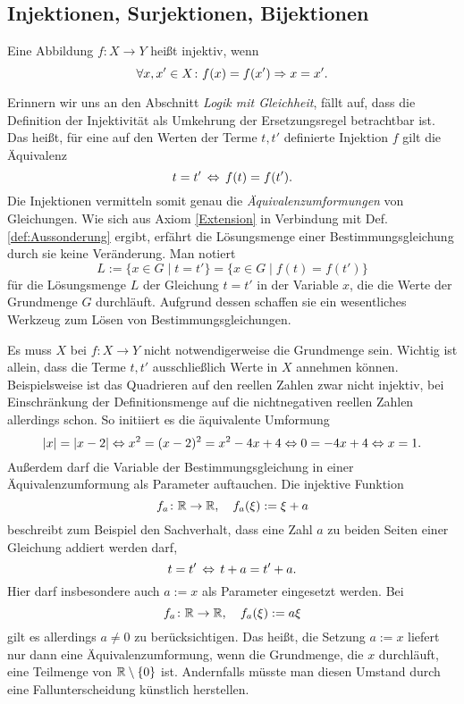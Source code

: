 \newpage
\subsection{Injektionen, Surjektionen, Bijektionen}

\begin{Definition}[Injektion]\label{def:injektiv}\newlinefirst
Eine Abbildung $f\colon X\to Y$ heißt injektiv, wenn%
\[\forall x,x'\in X\colon f(x)=f(x')\Rightarrow x=x'.\]
\end{Definition}

\noindent
Erinnern wir uns an den Abschnitt \emph{Logik mit Gleichheit}, fällt
auf, dass die Definition der Injektivität als Umkehrung der
Ersetzungsregel betrachtbar ist. Das heißt, für eine auf den Werten
der Terme $t,t'$ definierte Injektion $f$ gilt die Äquivalenz%
\[t=t'\, \Leftrightarrow\, f(t)=f(t').\]
Die Injektionen vermitteln somit genau die \emph{Äquivalenzumformungen}%
 von Gleichungen.
Wie sich aus Axiom \ref{Extension} in Verbindung mit
Def. \ref{def:Aussonderung} ergibt, erfährt die Lösungsmenge einer
Bestimmungsgleichung durch sie keine Veränderung. Man notiert%
\[L := \{x\in G\mid t=t'\} = \{x\in G\mid f(t)=f(t')\}\]
für die Lösungsmenge $L$ der Gleichung $t=t'$ in der Variable $x$,
die die Werte der Grundmenge $G$ durchläuft. Aufgrund dessen schaffen
sie ein wesentliches Werkzeug zum Lösen von Bestimmungsgleichungen.

Es muss $X$ bei $f\colon X\to Y$ nicht notwendigerweise die Grundmenge
sein. Wichtig ist allein, dass die Terme $t,t'$ ausschließlich Werte in
$X$ annehmen können. Beispielsweise ist das Quadrieren auf den reellen
Zahlen zwar nicht injektiv, bei Einschränkung der Definitionsmenge auf
die nichtnegativen reellen Zahlen allerdings schon. So initiiert es
die äquivalente Umformung%
\[|x| = |x-2| \Leftrightarrow x^2 = (x-2)^2 = x^2-4x+4 \Leftrightarrow
0 = -4x+4 \Leftrightarrow x = 1.\]
Außerdem darf die Variable der Bestimmungsgleichung in einer
Äquivalenzumformung als Parameter auftauchen. Die injektive Funktion%
\[f_a\colon\mathbb R\to\mathbb R,\quad f_a(\xi) := \xi + a\]
beschreibt zum Beispiel den Sachverhalt, dass eine Zahl $a$ zu beiden
Seiten einer Gleichung addiert werden darf,%
\[t = t'\, \Leftrightarrow\, t + a = t' + a.\]
Hier darf insbesondere auch $a:=x$ als Parameter eingesetzt werden. Bei%
\[f_a\colon\mathbb R\to\mathbb R,\quad f_a(\xi) := a\xi\]
gilt es allerdings $a\ne 0$ zu berücksichtigen. Das heißt, die Setzung
$a:=x$ liefert nur dann eine Äquivalenzumformung, wenn die Grundmenge,
die $x$ durchläuft, eine Teilmenge von $\mathbb R\setminus\{0\}$ ist. Andernfalls
müsste man diesen Umstand durch eine Fallunterscheidung künstlich herstellen.

